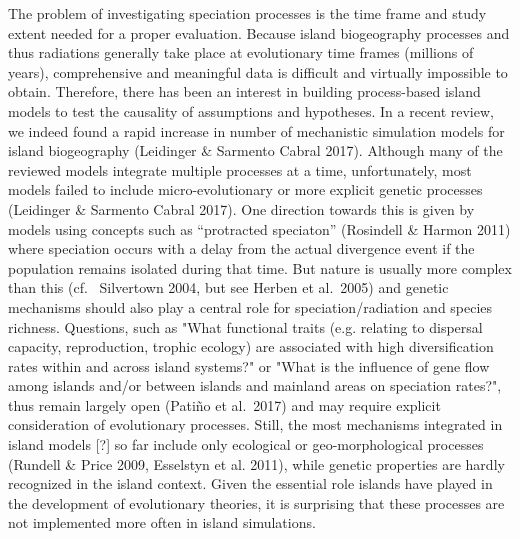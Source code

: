 \documentclass[a4paper]{scrartcl}
\begin{document}
The problem of investigating speciation processes is the time frame and study extent needed for a proper evaluation.
Because island biogeography processes and thus radiations generally take place at evolutionary time frames (millions of years),
comprehensive and meaningful data is difficult and virtually impossible to obtain.
Therefore, there has been an interest in building process-based island models to test the causality of assumptions and hypotheses.
In a recent review, we indeed found a rapid increase in number of mechanistic simulation models for island biogeography \cite{leidingerBiodiversityDynamicsIslands2017}
(Leidinger \& Sarmento Cabral 2017).
Although many of the reviewed models integrate multiple processes at a time, unfortunately,
most models failed to include micro-evolutionary or more explicit genetic processes %
(Leidinger \& Sarmento Cabral 2017).
One direction towards this is given by models using concepts such as ``protracted speciaton'' \cite{rosindellUnifiedModelSpecies2013}(Rosindell \& Harmon 2011)
where speciation occurs with a delay from the actual
divergence event if the population remains isolated during that time.
But nature is usually more complex than this (cf.\ \cite{silvertownGhostCompetitionPhylogeny2004} Silvertown 2004, but see \cite{herbenGhostHybridizationNiche2005} Herben et al.\ 2005)
and genetic mechanisms should also play a central role for speciation/radiation and species richness.
Questions, such as "What functional traits (e.g. relating to dispersal capacity,
reproduction, trophic ecology) are associated with high diversification rates within and across island systems?"
or "What is the influence of gene flow among islands and/or
between islands and mainland areas on speciation rates?", thus remain largely open \cite{patinoRoadmapIslandBiology2017}(Patiño et al.\ 2017)
and may require explicit consideration of evolutionary processes.
Still, the most mechanisms integrated in island models [?] so far include only ecological
or geo-morphological processes (Rundell \& Price 2009, Esselstyn et al. 2011),
while genetic properties are hardly recognized in the island context.
Given the essential role islands have played in the development of evolutionary theories, it is surprising that these processes
are not implemented more often in island simulations.
\end{document}
